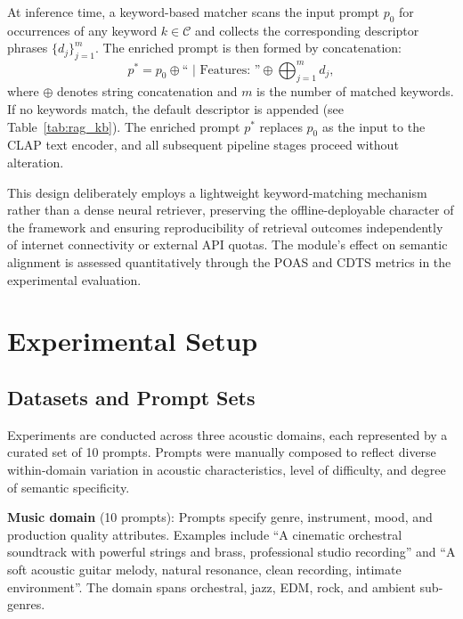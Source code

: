 \documentclass[journal]{IEEEtran}
\begin{document}
At inference time, a keyword-based matcher scans the input prompt
$p_0$ for occurrences of any keyword $k \in \mathcal{C}$ and collects the
corresponding descriptor phrases $\{d_j\}_{j=1}^{m}$. The enriched
prompt is then formed by concatenation:
\begin{equation}
  p^* = p_0 \oplus \text{`` | Features: ''} \oplus
  \bigoplus_{j=1}^{m} d_j,
  \label{eq:rag_concat}
\end{equation}
where $\oplus$ denotes string concatenation and $m$ is the number of
matched keywords. If no keywords match, the default descriptor is
appended (see Table~\ref{tab:rag_kb}). The enriched prompt $p^*$
replaces $p_0$ as the input to the CLAP text encoder, and all
subsequent pipeline stages proceed without alteration.

This design deliberately employs a lightweight keyword-matching
mechanism rather than a dense neural retriever, preserving the
offline-deployable character of the framework and ensuring
reproducibility of retrieval outcomes independently of internet
connectivity or external API quotas. The module's effect on semantic
alignment is assessed quantitatively through the POAS and CDTS metrics
in the experimental evaluation.

\section{Experimental Setup}
\label{sec:exp}

\subsection{Datasets and Prompt Sets}

Experiments are conducted across three acoustic domains, each
represented by a curated set of 10 prompts. Prompts were manually
composed to reflect diverse within-domain variation in acoustic
characteristics, level of difficulty, and degree of semantic specificity.

\noindent\textbf{Music domain} (10 prompts): Prompts specify genre,
instrument, mood, and production quality attributes. Examples include
``A cinematic orchestral soundtrack with powerful strings and brass,
professional studio recording'' and ``A soft acoustic guitar melody,
natural resonance, clean recording, intimate environment''. The domain
spans orchestral, jazz, EDM, rock, and ambient sub-genres.
\end{document}
